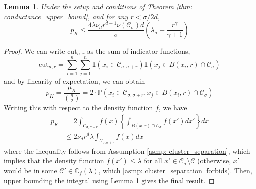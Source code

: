 \documentclass{article}
\newcommand{\1}{\mathbf{1}}
\newcommand{\cut}{\mathrm{cut}}
\newcommand{\Pbb}{\mathbb{P}}
\newcommand{\Cbb}{\mathbb{C}}
\newcommand{\Cset}{\mathcal{C}}
\newcommand{\Csig}{\Cset_{\sigma}}
\newcommand{\Csigr}{\Cset_{\sigma,\sigma + r}}
\theoremstyle{aldenthm}
\newtheorem{lemma}{Lemma}
\begin{document}
\begin{lemma}
	\label{lem: expected_density_cut}
	Under the setup and conditions of Theorem \ref{thm: conductance_upper_bound}, and for any $r < \sigma/2d$,
	\begin{equation*}
	p_K \leq \frac{4 \lambda \nu_d r^{d+1} \nu(\Csig)d}{\sigma}  \left(\lambda_{\sigma} - \frac{r^{\gamma}}{\gamma + 1}\right)
	\end{equation*}
\end{lemma}
\begin{proof}
	We can write $\cut_{n,r}$ as the sum of indicator functions,
	\begin{equation}
	\label{eqn: density_cut_expansion}
	\cut_{n,r} = \sum_{i = 1}^{n} \sum_{j = 1}^{n} \1(x_i \in \Csigr) \1(x_j \in B(x_i,r) \cap \Csig)
	\end{equation}
	and by linearity of expectation, we can obtain
	\begin{equation*}
	p_K = \frac{\mu_K}{{n \choose 2}} = 2 \cdot \Pbb(x_i \in \Csigr, x_j \in B(x_i,r) \cap \Csig)
	\end{equation*}
	Writing this with respect to the density function $f$, we have
	\begin{align*}
	p_K & = 2 \int_{\Csigr} f(x) \left\{ \int_{B(x,r) \cap \Csig} f(x') dx' \right\} dx \\
	& \leq 2 \nu_d r^d \lambda  \int_{\Csigr} f(x) dx
	\end{align*}
	where the inequality follows from Assumption \ref{asmp: cluster_separation}, which implies that the density function $f(x') \leq \lambda$ for all $x' \in \Csig \setminus \Cset$ (otherwise, $x'$ would be in some $\Cset' \in \Cbb_f(\lambda)$, which \ref{asmp: cluster_separation} forbids). Then, upper bounding the integral using Lemma \ref{lem: expected_density_cut} gives the final result.
\end{proof}
\end{document}
